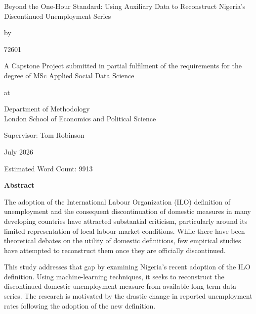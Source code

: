 \documentclass[
  letterpaper,
  DIV=11,
  numbers=noendperiod]{scrartcl}
\author{}
\date{}
\begin{document}
\begin{titlepage}
\centering

\vspace*{2cm}

{\Huge Beyond the One-Hour Standard: Using Auxiliary Data to Reconstruct Nigeria's Discontinued Unemployment Series \par}

\vspace{2cm}

by

\vspace{1cm}

{\Large 72601\par}

\vspace{1cm}

A Capstone Project submitted in partial fulfilment
of the requirements for the degree of
MSc Applied Social Data Science

\vspace{1cm}

at

\vfill

Department of Methodology\\
London School of Economics and Political Science\\

\vspace{1cm}

Supervisor: Tom Robinson

July 2026

Estimated Word Count: 9913

\end{titlepage}
\newpage

\textbf{Abstract}

The adoption of the International Labour Organization (ILO) definition
of unemployment and the consequent discontinuation of domestic measures
in many developing countries have attracted substantial criticism,
particularly around its limited representation of local labour-market
conditions. While there have been theoretical debates on the utility of
domestic definitions, few empirical studies have attempted to
reconstruct them once they are officially discontinued.

This study addresses that gap by examining Nigeria's recent adoption of
the ILO definition. Using machine-learning techniques, it seeks to
reconstruct the discontinued domestic unemployment measure from
available long-term data series. The research is motivated by the
drastic change in reported unemployment rates following the adoption of
the new definition.
\end{document}
